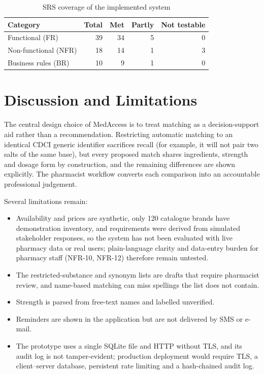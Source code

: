 \documentclass[11pt,a4paper]{article}
\begin{document}
\begin{table}[H]
\caption{SRS coverage of the implemented system}
\label{tab:cov}
\centering
\small
\begin{tabular}{@{}lrrrr@{}}
\toprule
Category & Total & Met & Partly & Not testable \\
\midrule
Functional (FR)       & 39 & 34 & 5 & 0 \\
Non-functional (NFR)  & 18 & 14 & 1 & 3 \\
Business rules (BR)   & 10 & 9  & 1 & 0 \\
\bottomrule
\end{tabular}
\end{table}

\section{Discussion and Limitations}\label{ch:disc}
The central design choice of MedAccess is to treat matching as a decision-support aid rather than a recommendation. Restricting automatic matching to an identical CDCI generic identifier sacrifices recall (for example, it will not pair two salts of the same base), but every proposed match shares ingredients, strength and dosage form by construction, and the remaining differences are shown explicitly. The pharmacist workflow converts each comparison into an accountable professional judgement.

Several limitations remain:
\begin{itemize}
\item Availability and prices are synthetic, only 120 catalogue brands have demonstration inventory, and requirements were derived from simulated stakeholder responses, so the system has not been evaluated with live pharmacy data or real users; plain-language clarity and data-entry burden for pharmacy staff (NFR-10, NFR-12) therefore remain untested.
\item The restricted-substance and synonym lists are drafts that require pharmacist review, and name-based matching can miss spellings the list does not contain.
\item Strength is parsed from free-text names and labelled unverified.
\item Reminders are shown in the application but are not delivered by SMS or e-mail.
\item The prototype uses a single SQLite file and HTTP without TLS, and its audit log is not tamper-evident; production deployment would require TLS, a client--server database, persistent rate limiting and a hash-chained audit log.
\end{itemize}
\end{document}
